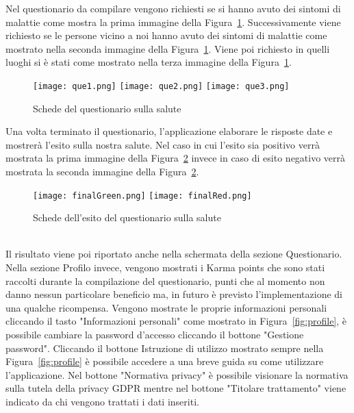 \begin{trivlist}
	Nel questionario da compilare vengono richiesti se si hanno avuto dei sintomi di malattie come mostra la prima immagine della Figura~\ref{fig:queSlide}. Successivamente viene richiesto se le persone vicino a noi hanno avuto dei sintomi di malattie come mostrato nella seconda immagine della Figura~\ref{fig:queSlide}. Viene poi richiesto in quelli luoghi si è stati come mostrato nella terza immagine della Figura~\ref{fig:queSlide}.
	\begin{figure}[h]
		\begin{center}
			\texttt{[image: que1.png]}\hfill
			\texttt{[image: que2.png]}\hfill
			\texttt{[image: que3.png]}
			\caption{Schede del questionario sulla salute}\label{fig:queSlide}
		\end{center}
	\end{figure}
	Una volta terminato il questionario, l'applicazione elaborare le risposte date e mostrerà l'esito sulla nostra salute. Nel caso in cui l'esito sia positivo verrà mostrata la prima immagine della Figura~\ref{fig:quefinal} invece in caso di esito negativo verrà mostrata la seconda immagine della Figura~\ref{fig:quefinal}.
	\begin{figure}[h]
		\begin{center}
			\texttt{[image: finalGreen.png]}\hfil
			\texttt{[image: finalRed.png]}
			\caption{Schede dell'esito del questionario sulla salute}\label{fig:quefinal}
		\end{center}
	\end{figure}\\
	Il risultato viene poi riportato anche nella schermata della sezione Questionario.
	\\
	Nella sezione Profilo invece, vengono mostrati i Karma points che sono stati raccolti durante la compilazione del questionario, punti che al momento non danno nessun particolare beneficio ma, in futuro è previsto l'implementazione di una qualche ricompensa. Vengono mostrate le proprie informazioni personali cliccando il tasto "Informazioni personali" come mostrato in Figura~\ref{fig:profile}, è possibile cambiare la password d'accesso cliccando il bottone "Gestione password". Cliccando il bottone Istruzione di utilizzo mostrato sempre nella Figura~\ref{fig:profile} è possibile accedere a una breve guida su come utilizzare l'applicazione. Nel bottone "Normativa privacy" è possibile visionare la normativa sulla tutela della privacy GDPR mentre nel bottone "Titolare trattamento" viene indicato da chi vengono trattati i dati inseriti.

\end{trivlist}
